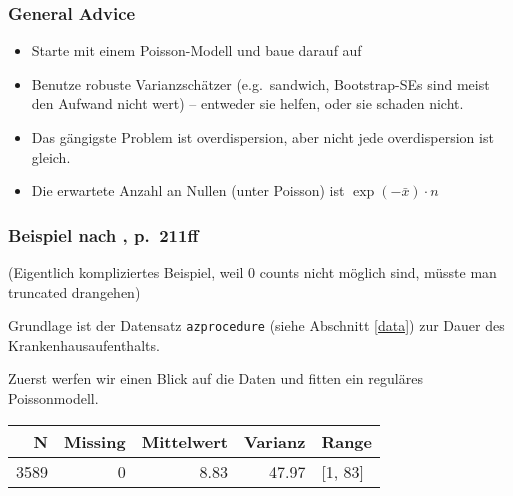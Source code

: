 \documentclass[ngerman,a4paper,]{scrartcl}
\newenvironment{Shaded}{\begin{snugshade}}{\end{snugshade}}
\newcommand{\DataTypeTok}[1]{\textcolor[rgb]{0.13,0.29,0.53}{#1}}
\newcommand{\KeywordTok}[1]{\textcolor[rgb]{0.13,0.29,0.53}{\textbf{#1}}}
\newcommand{\NormalTok}[1]{#1}
\newcommand{\OperatorTok}[1]{\textcolor[rgb]{0.81,0.36,0.00}{\textbf{#1}}}
\newcommand{\StringTok}[1]{\textcolor[rgb]{0.31,0.60,0.02}{#1}}
\providecommand{\tightlist}{%
  \setlength{\itemsep}{0pt}\setlength{\parskip}{0pt}}
\theoremstyle{definition}
\theoremstyle{definition}
\theoremstyle{definition}
\theoremstyle{remark}
\begin{document}
\hypertarget{general-advice}{%
\subsubsection{General Advice}\label{general-advice}}

\begin{itemize}
\tightlist
\item
  Starte mit einem Poisson-Modell und baue darauf auf
\item
  Benutze robuste Varianzschätzer (e.g.~sandwich, Bootstrap-SEs sind meist den Aufwand nicht wert) -- entweder sie helfen, oder sie schaden nicht.
\item
  Das gängigste Problem ist overdispersion, aber nicht jede overdispersion ist gleich.
\item
  Die erwartete Anzahl an Nullen (unter Poisson) ist \(\exp(-\bar{x}) \cdot n\)
\end{itemize}

\hypertarget{beispiel-nach-hilbemodelingcountdata2014-p.211ff}{%
\subsubsection{\texorpdfstring{Beispiel nach \citet{hilbeModelingCountData2014}, p.~211ff}{Beispiel nach @hilbeModelingCountData2014, p.~211ff}}\label{beispiel-nach-hilbemodelingcountdata2014-p.211ff}}

(Eigentlich kompliziertes Beispiel, weil 0 counts nicht möglich sind, müsste man truncated drangehen)

Grundlage ist der Datensatz \texttt{azprocedure} (siehe Abschnitt \ref{data}) zur Dauer des Krankenhausaufenthalts.

Zuerst werfen wir einen Blick auf die Daten und fitten ein reguläres Poissonmodell.

\begin{Shaded}
\end{Shaded}

\begin{table}[H]
\centering
\begin{tabular}{rrrrl}
\toprule
N & Missing & Mittelwert & Varianz & Range\\
\midrule
3589 & 0 & 8.83 & 47.97 & [1, 83]\\
\bottomrule
\end{tabular}
\end{table}
\end{document}
